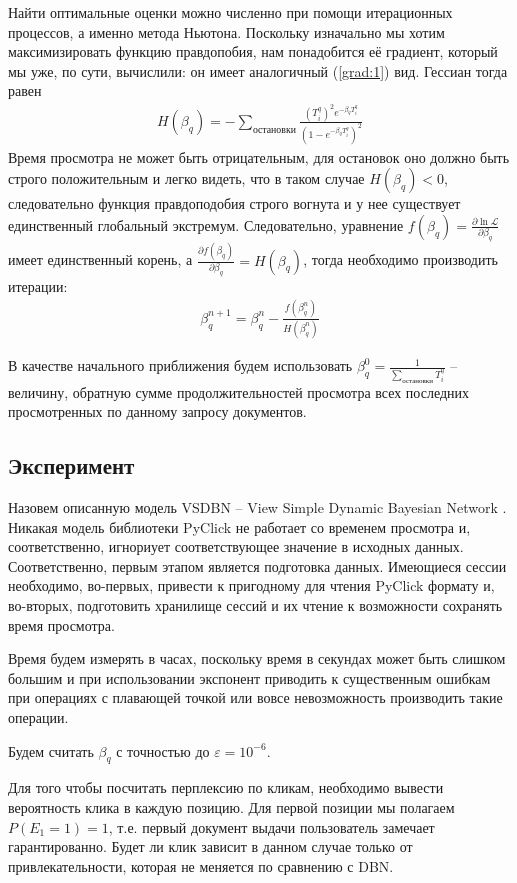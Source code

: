 \documentclass[diploma]{nanolab2015}
\begin{document}
Найти оптимальные оценки можно численно при помощи итерационных процессов, а именно метода Ньютона. Поскольку изначально мы хотим максимизировать функцию правдопобия, нам понадобится её градиент, который мы уже, по сути, вычислили: он имеет аналогичный (\ref{grad:1}) вид. Гессиан тогда равен
\begin{align}
    H(\beta_q) = - \sum_{\text{остановки}} \frac{(T_i^q)^2 e^{-\beta_q T_i^q}}{(1 - e^{-\beta_q T_i^q})^2}
\end{align}
Время просмотра не может быть отрицательным, для остановок оно должно быть строго положительным и легко видеть, что в таком случае $H(\beta_q) < 0$, следовательно функция правдоподобия строго вогнута и у нее существует единственный глобальный экстремум. Следовательно, уравнение $ f(\beta_q) = \frac{\partial \ln \mathcal{L}}{\partial \beta_q}$ имеет единственный корень, а $\frac{\partial f(\beta_q)}{\partial \beta_q} = H(\beta_q)$, тогда необходимо производить итерации:
\begin{align}
    \beta_q^{n+1} = \beta_q^{n} - \frac{f(\beta_q^n)}{H(\beta_q^n)}
\end{align}

В качестве начального приближения будем использовать $\beta_q^0 = \frac{1}{\sum\limits_{\text{остановки}} T_i^q}$ -- величину, обратную сумме продолжительностей просмотра всех последних просмотренных по данному запросу документов.

\subsection{Эксперимент}
Назовем описанную модель VSDBN -- View Simple Dynamic Bayesian Network \cite{vsdbn}.
Никакая модель библиотеки PyClick не работает со временем просмотра и, соответственно, игнориует соответствующее значение в исходных данных. Соответственно, первым этапом является подготовка данных. Имеющиеся сессии \cite{vkds} необходимо, во-первых, привести к пригодному для чтения PyClick формату и, во-вторых, подготовить хранилище сессий и их чтение к возможности сохранять время просмотра.

Время будем измерять в часах, поскольку время в секундах может быть слишком большим и при использовании экспонент приводить к существенным ошибкам при операциях с плавающей точкой или вовсе невозможность производить такие операции.

Будем считать $\beta_q$ с точностью до $\varepsilon = 10^{-6}$.

Для того чтобы посчитать перплексию по кликам, необходимо вывести вероятность клика в каждую позицию. Для первой позиции мы полагаем $P(E_1 = 1) = 1$, т.е. первый документ выдачи пользователь замечает гарантированно. Будет ли клик зависит в данном случае только от привлекательности, которая не меняется по сравнению с DBN.
\end{document}
